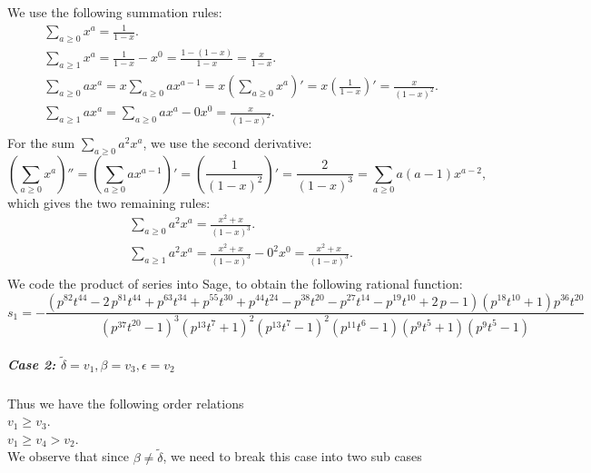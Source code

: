 \documentclass{article}
\begin{document}
We use the following summation rules:
\begin{align*}
&\sum_{a\geq{0}}x^a=\frac{1}{1-x}.\\
&\sum_{a\geq{1}}x^a=\frac{1}{1-x}-x^0=\frac{1-(1-x)}{1-x}=\frac{x}{1-x}.\\
&\sum_{a\geq{0}}ax^a=x\sum_{a\geq{0}}ax^{a-1}=x\left(\sum_{a\geq{0}}x^a\right)'=x\left(\frac{1}{1-x}\right)'=\frac{x}{(1-x)^2}.\\
&\sum_{a\geq{1}}ax^a=\sum_{a\geq{0}}ax^a-0x^0=\frac{x}{(1-x)^2}.\\
\end{align*}
For the sum $\sum_{a\geq{0}}a^2x^a$, we use the second derivative:
\[\left(\sum_{a\geq{0}}x^a\right)''=\left(\sum_{a\geq{0}}ax^{a-1}\right)'=\left(\frac{1}{(1-x)^2}\right)'=\frac{2}{(1-x)^3}=\sum_{a\geq{0}}a(a-1)x^{a-2},\]
which gives the two remaining rules:
\begin{align*}
&\sum_{a\geq{0}}a^2x^a=\frac{x^2+x}{(1-x)^3}.\\
&\sum_{a\geq{1}}a^2x^a=\frac{x^2+x}{(1-x)^3}-0^2x^0=\frac{x^2+x}{(1-x)^3}.\\
\end{align*}
We code the product of series into Sage, to obtain the following rational function:\\
\[s_1=
-\frac{{\left(p^{82} t^{44} - 2 \, p^{81} t^{44} + p^{63} t^{34} + p^{55} t^{30} + p^{44} t^{24} - p^{38} t^{20} - p^{27} t^{14} - p^{19} t^{10} + 2 \, p - 1\right)} {\left(p^{18} t^{10} + 1\right)} p^{36} t^{20}}{{\left(p^{37} t^{20} - 1\right)}^{3} {\left(p^{13} t^{7} + 1\right)}^{2} {\left(p^{13} t^{7} - 1\right)}^{2} {\left(p^{11} t^{6} - 1\right)} {\left(p^{9} t^{5} + 1\right)} {\left(p^{9} t^{5} - 1\right)}}
\]
\subparagraph{Case 2: $\tilde\delta=v_1,\beta=v_3,\epsilon=v_2$}
Thus we have the following order relations\\
$v_1\geq{v_3}$.\\
$v_1\geq{v_4}>v_2$.\\
We observe that since $\beta\neq\tilde\delta$, we need to break this case into two sub cases
\end{document}
